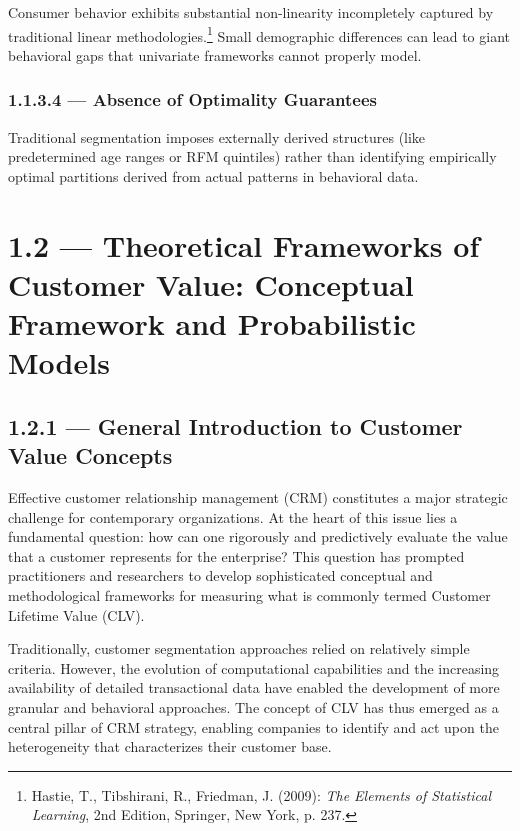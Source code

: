 \documentclass[12pt,a4paper,oneside]{report}
\begin{document}
Consumer behavior exhibits substantial non-linearity incompletely captured by traditional linear methodologies.\footnote{Hastie, T., Tibshirani, R., Friedman, J. (2009): \textit{The Elements of Statistical Learning}, 2nd Edition, Springer, New York, p. 237.} Small demographic differences can lead to giant behavioral gaps that univariate frameworks cannot properly model.

\subsubsection{1.1.3.4 — Absence of Optimality Guarantees}

Traditional segmentation imposes externally derived structures (like predetermined age ranges or RFM quintiles) rather than identifying empirically optimal partitions derived from actual patterns in behavioral data.

\section{1.2 — Theoretical Frameworks of Customer Value: Conceptual Framework and Probabilistic Models}

\subsection{1.2.1 — General Introduction to Customer Value Concepts}

Effective customer relationship management (CRM) constitutes a major strategic challenge for contemporary organizations. At the heart of this issue lies a fundamental question: how can one rigorously and predictively evaluate the value that a customer represents for the enterprise? This question has prompted practitioners and researchers to develop sophisticated conceptual and methodological frameworks for measuring what is commonly termed Customer Lifetime Value (CLV).

Traditionally, customer segmentation approaches relied on relatively simple criteria. However, the evolution of computational capabilities and the increasing availability of detailed transactional data have enabled the development of more granular and behavioral approaches. The concept of CLV has thus emerged as a central pillar of CRM strategy, enabling companies to identify and act upon the heterogeneity that characterizes their customer base.
\end{document}
